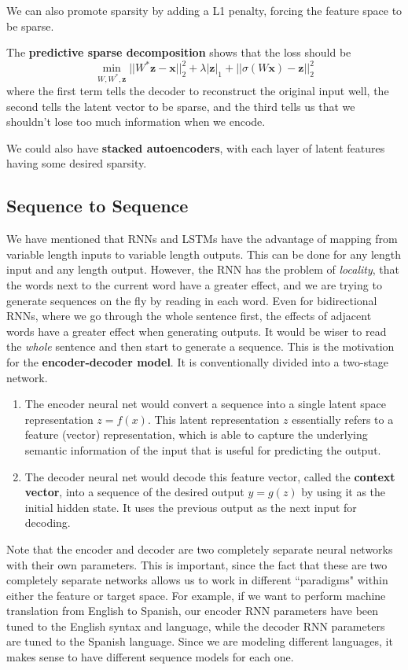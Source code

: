 \begin{enumerate}
      We can also promote sparsity by adding a L1 penalty, forcing the feature space to be sparse. 
    \end{enumerate}

    The \textbf{predictive sparse decomposition} shows that the loss should be 
    \begin{equation}
      \min_{W, W^\ast, \mathbf{z}} ||W^\ast \mathbf{z} - \mathbf{x}||^2_2 + \lambda | \mathbf{z}|_1 + ||\sigma(W \mathbf{x}) - \mathbf{z}||^2_2
    \end{equation}
    where the first term tells the decoder to reconstruct the original input well, the second tells the latent vector to be sparse, and the third tells us that we shouldn't lose too much information when we encode. 

    We could also have \textbf{stacked autoencoders}, with each layer of latent features having some desired sparsity. 

  \subsection{Sequence to Sequence}

    We have mentioned that RNNs and LSTMs have the advantage of mapping from variable length inputs to variable length outputs. This can be done for any length input and any length output. However, the RNN has the problem of \textit{locality}, that the words next to the current word have a greater effect, and we are trying to generate sequences on the fly by reading in each word. Even for bidirectional RNNs, where we go through the whole sentence first, the effects of adjacent words have a greater effect when generating outputs. It would be wiser to read the \textit{whole} sentence and then start to generate a sequence. This is the motivation for the \textbf{encoder-decoder model}. It is conventionally divided into a two-stage network. 
    \begin{enumerate}
      \item The encoder neural net would convert a sequence into a single latent space representation $z = f(x)$. This latent representation $z$ essentially refers to a feature (vector) representation, which is able to capture the underlying semantic information of the input that is useful for predicting the output. 
      \item The decoder neural net would decode this feature vector, called the \textbf{context vector}, into a sequence of the desired output $y = g(z)$ by using it as the initial hidden state. It uses the previous output as the next input for decoding. 
    \end{enumerate}
    Note that the encoder and decoder are two completely separate neural networks with their own parameters. This is important, since the fact that these are two completely separate networks allows us to work in different ``paradigms" within either the feature or target space. For example, if we want to perform machine translation from English to Spanish, our encoder RNN parameters have been tuned to the English syntax and language, while the decoder RNN parameters are tuned to the Spanish language. Since we are modeling different languages, it makes sense to have different sequence models for each one. 

